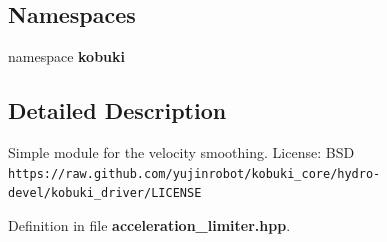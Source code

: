 \subsection*{\-Namespaces}
\begin{DoxyCompactItemize}
\item 
namespace {\bf kobuki}
\end{DoxyCompactItemize}


\subsection{\-Detailed \-Description}
\-Simple module for the velocity smoothing. \-License\-: \-B\-S\-D {\tt https\-://raw.\-github.\-com/yujinrobot/kobuki\-\_\-core/hydro-\/devel/kobuki\-\_\-driver/\-L\-I\-C\-E\-N\-S\-E} 

\-Definition in file {\bf acceleration\-\_\-limiter.\-hpp}.

